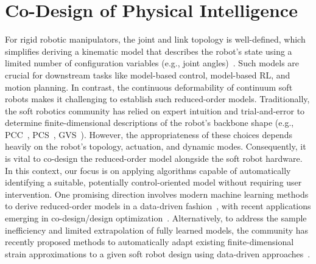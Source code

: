 \section{Co-Design of Physical Intelligence}\label{sec:apx:holisticcodesign:codesigning_physical_intelligence}
For rigid robotic manipulators, the joint and link topology is well-defined, which simplifies deriving a kinematic model that describes the robot’s state using a limited number of configuration variables (e.g., joint angles)~\citep{siciliano2010robotics, zhao2020robogrammar}. Such models are crucial for downstream tasks like model-based control, model-based RL, and motion planning. In contrast, the continuous deformability of continuum soft robots makes it challenging to establish such reduced-order models. Traditionally, the soft robotics community has relied on expert intuition and trial-and-error to determine finite-dimensional descriptions of the robot’s backbone shape (e.g., \gls{PCC}~\citep{webster2010design}, PCS~\citep{renda2018discrete}, \gls{GVS}~\citep{renda2020geometric}). However, the appropriateness of these choices depends heavily on the robot’s topology, actuation, and dynamic modes. Consequently, it is vital to co-design the reduced-order model alongside the soft robot hardware. In this context, our focus is on applying algorithms capable of automatically identifying a suitable, potentially control-oriented model without requiring user intervention. One promising direction involves modern machine learning methods to derive reduced-order models in a data-driven fashion~\citep{thuruthel2017learning, bern2020soft, alora2023data, chen2024data, menager2023direct}, with recent applications emerging in co-design/design optimization~\citep{navez2024contributions}. Alternatively, to address the sample inefficiency and limited extrapolation of fully learned models, the community has recently proposed methods to automatically adapt existing finite-dimensional strain approximations to a given soft robot design using data-driven approaches~\citep{alkayas2025soft, valadas2025learning}.

